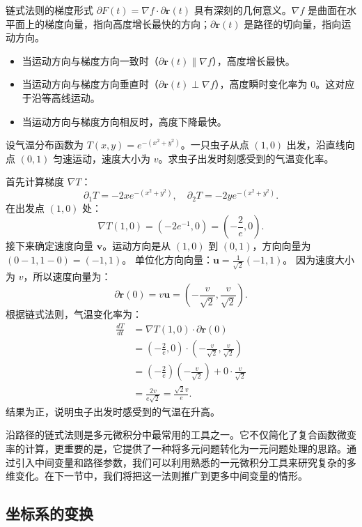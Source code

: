 \documentclass[12pt,UTF8]{ctexbook}
\begin{document}
链式法则的梯度形式 $\partial F(t) = \nabla f \cdot \partial\mathbf{r}(t)$ 具有深刻的几何意义。$\nabla f$ 是曲面在水平面上的梯度向量，指向高度增长最快的方向；$\partial\mathbf{r}(t)$ 是路径的切向量，指向运动方向。
\begin{itemize}
\item 当运动方向与梯度方向一致时（$\partial\mathbf{r}(t) \parallel \nabla f$），高度增长最快。
\item 当运动方向与梯度方向垂直时（$\partial\mathbf{r}(t) \perp \nabla f$），高度瞬时变化率为 0。这对应于沿等高线运动。
\item 当运动方向与梯度方向相反时，高度下降最快。
\end{itemize}

\begin{et}
设气温分布函数为 $T(x, y) = e^{-(x^2 + y^2)}$。一只虫子从点 $(1, 0)$ 出发，沿直线向点 $(0, 1)$ 匀速运动，速度大小为 $v$。求虫子出发时刻感受到的气温变化率。
\end{et}
\begin{so}
首先计算梯度 $\nabla T$：
$$ \partial_1 T = -2x e^{-(x^2 + y^2)}, \quad \partial_2 T = -2y e^{-(x^2 + y^2)}. $$
在出发点 $(1, 0)$ 处：
$$ \nabla T(1, 0) = (-2e^{-1}, 0) = \left(-\frac{2}{e}, 0\right). $$
接下来确定速度向量 $\mathbf{v}$。运动方向是从 $(1, 0)$ 到 $(0, 1)$，方向向量为 $(0-1, 1-0) = (-1, 1)$。
单位化方向向量：$\mathbf{u} = \frac{1}{\sqrt{2}}(-1, 1)$。
因为速度大小为 $v$，所以速度向量为：
$$ \partial \mathbf{r}(0) = v \mathbf{u} = \left(-\frac{v}{\sqrt{2}}, \frac{v}{\sqrt{2}}\right). $$
根据链式法则，气温变化率为：
\begin{align*}
\frac{dT}{dt} &= \nabla T(1, 0) \cdot \partial \mathbf{r}(0) \\
&= \left(-\frac{2}{e}, 0\right) \cdot \left(-\frac{v}{\sqrt{2}}, \frac{v}{\sqrt{2}}\right) \\
&= \left(-\frac{2}{e}\right)\left(-\frac{v}{\sqrt{2}}\right) + 0 \cdot \frac{v}{\sqrt{2}} \\
&= \frac{2v}{e\sqrt{2}} = \frac{\sqrt{2}v}{e}.
\end{align*}
结果为正，说明虫子出发时感受到的气温在升高。
\end{so}

沿路径的链式法则是多元微积分中最常用的工具之一。它不仅简化了复合函数微变率的计算，更重要的是，它提供了一种将多元问题转化为一元问题处理的思路。通过引入中间变量和路径参数，我们可以利用熟悉的一元微积分工具来研究复杂的多维变化。在下一节中，我们将把这一法则推广到更多中间变量的情形。

\subsection{坐标系的变换}
\end{document}
